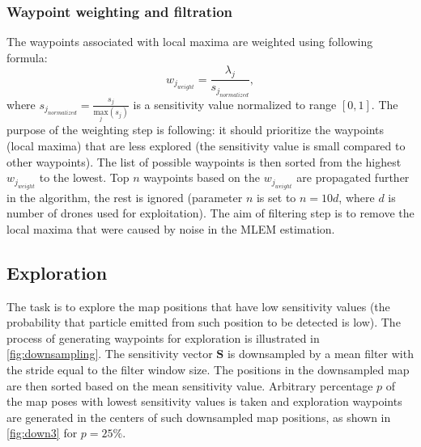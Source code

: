 \subsubsection{Waypoint weighting and filtration}
The waypoints associated with local maxima are weighted using following formula:
\begin{equation}
  w_{j_{weight}} = \frac{\lambda_{j}}{    s_{j_{normalized}} },
\end{equation}
where $s_{j_{normalized}} = \frac{ s_{j} }{ \underset{j}{\mathrm{max}}(s_{j})}$ is a sensitivity value normalized to range $[0, 1]$.
The purpose of the weighting step is following: it should prioritize the waypoints (local maxima) that are less explored (the sensitivity value is small compared to other waypoints).
The list of possible waypoints is then sorted from the highest $w_{j_{weight}}$ to the lowest.
Top $n$ waypoints based on the $w_{j_{weight}}$ are propagated further in the algorithm, the rest is ignored (parameter $n$ is set to $n = 10d$, where $d$ is number of drones used for exploitation).
The aim of filtering step is to remove the local maxima that were caused by noise in the \ac{MLEM} estimation.%

\subsection{Exploration}
The task is to explore the map positions that have low sensitivity values (the probability that particle emitted from such position to be detected is low).
The process of generating waypoints for exploration is illustrated in  \autoref{fig:downsampling}.
The sensitivity vector $\mathbf{S}$ is downsampled by a mean filter with the stride equal to the filter window size.
The positions in the downsampled map are then sorted based on the mean sensitivity value.
Arbitrary percentage $p$ of the map poses with lowest sensitivity values is taken and exploration waypoints are generated in the centers of such downsampled map positions, as shown in  \autoref{fig:down3} for $p = 25\%$.

